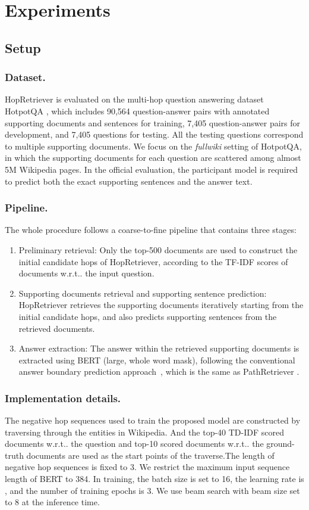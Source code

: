 \documentclass[letterpaper]{article} \usepackage{aaai21}  \usepackage{times}  \usepackage{helvet} \usepackage{courier}  \usepackage[hyphens]{url}  \usepackage{graphicx} \urlstyle{rm} \def\UrlFont{\rm}  \usepackage{graphicx}  \usepackage{natbib}  \usepackage{caption} \frenchspacing  \setlength{\pdfpagewidth}{8.5in}  \setlength{\pdfpageheight}{11in}
\makeatletter
\DeclareRobustCommand\onedot{\futurelet\@let@token\@onedot}
\def\@onedot{\ifx\@let@token.\else.\null\fi\xspace}
\def\wrt{w.r.t\onedot} \def\dof{d.o.f\onedot}
\makeatother
\begin{document}
\section{Experiments}
\subsection{Setup}
\subsubsection{Dataset.} 
HopRetriever is evaluated on the multi-hop question answering dataset HotpotQA \cite{hotpot-qa-dataset}, which includes 90,564 question-answer pairs with annotated supporting documents and sentences for training, 7,405 question-answer pairs for development, and 7,405 questions for testing. All the testing questions correspond to multiple supporting documents. We focus on the \textit{fullwiki} setting of HotpotQA, in which the supporting documents for each question are scattered among almost 5M Wikipedia pages. In the official evaluation, the participant model is required to predict both the exact supporting sentences and the answer text.


\subsubsection{Pipeline.}
The whole procedure follows a coarse-to-fine pipeline that contains three stages: 
\begin{enumerate}
    \item Preliminary retrieval: Only the top-500 documents are used to construct the initial candidate hops of HopRetriever, according to the TF-IDF scores of documents \wrt the input question.
    \item Supporting documents retrieval and supporting sentence prediction: HopRetriever retrieves the supporting documents iteratively starting from the initial candidate hops, and also predicts supporting sentences from the retrieved documents.  \item Answer extraction: The answer within the retrieved supporting documents is extracted using BERT (large, whole word mask), following the conventional answer boundary prediction approach~\cite{BERT,seobi}, which is the same as PathRetriever \cite{asai2019PR}.
\end{enumerate}

\subsubsection{Implementation details.}
The negative hop sequences used to train the proposed model are constructed by traversing through the entities in Wikipedia. And the top-40 TD-IDF scored documents \wrt the question and top-10 scored documents \wrt the ground-truth documents are used as the start points of the traverse.The length of negative hop sequences is fixed to 3. We restrict the maximum input sequence length of BERT to 384. In training, the batch size is set to 16, the learning rate is , and the number of training epochs is 3. We use beam search with beam size set to 8 at the inference time. 
\end{document}
